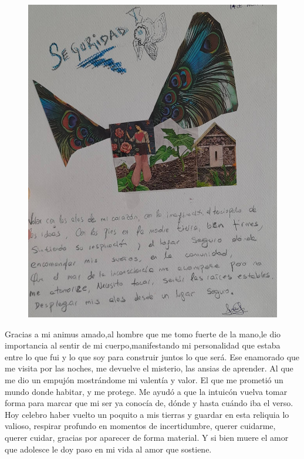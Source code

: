 \documentclass[12pt, a4paper, twoside]{book} %
\begin{document}
\begin{figure}[H]
	\centering
	\includegraphics[width=\textwidth]{./images/1f81324df158d6.jpg}
\end{figure}

Gracias a mi animus amado,al hombre que me tomo fuerte de la mano,le dio importancia al sentir de mi cuerpo,manifestando mi personalidad que estaba entre lo que fui y lo que soy para construir juntos lo que será.
Ese enamorado que me visita por las noches, me devuelve el misterio, las ansias de aprender.
Al que me dio un empujón mostrándome mi valentía y valor.
El que me prometió un mundo donde habitar, y me protege.
Me ayudó a que la intuicón vuelva tomar forma para marcar que mi ser ya conocía de, dónde y hasta cuándo iba el verso.
Hoy celebro haber vuelto un poquito a mis tierras y guardar en esta reliquia lo valioso, respirar profundo en momentos de incertidumbre, querer cuidarme, querer cuidar, gracias por aparecer de forma material.
Y si bien muere el amor que adolesce le doy paso en mi vida al amor que sostiene.
\end{document}
